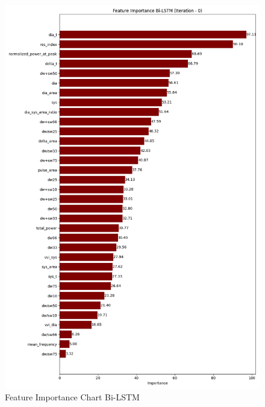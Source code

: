 \begin{figure}[h]
    \centering
    \vspace{-1cm}
    \hspace{-2cm}
    \includegraphics[width=\textwidth]{images/results/feature_importance/feature_importance_plot_Bi-LSTM_0}
    \caption{Feature Importance Chart Bi-LSTM}
    \label{fig:fi_bi_lstm}
\end{figure}

